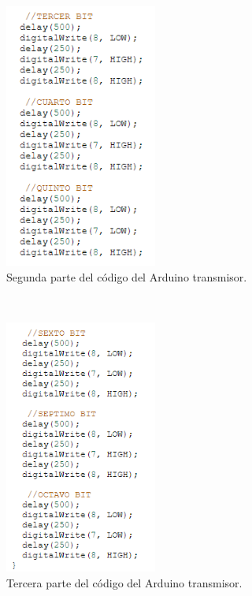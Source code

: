 \documentclass{article}
\begin{document}
\newpage

\begin{figure}[h]
\includegraphics[width=5cm]{codigo_arduino1_2.PNG}
\centering
\caption{Segunda parte del código del Arduino transmisor.}
\label{fig:codigo_arduino1_2.PNG}
\end{figure}
\cite{punto2}\\

\newpage

\begin{figure}[h]
\includegraphics[width=5cm]{codigo_arduino1_3.PNG}
\centering
\caption{Tercera parte del código del Arduino transmisor.}
\label{fig:codigo_arduino1_3.PNG}
\end{figure}
\cite{punto2}\\


\newpage
\end{document}
